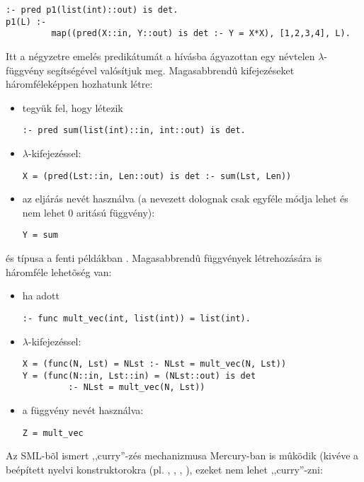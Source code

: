 \begin{verbatim} 
:- pred p1(list(int)::out) is det.
p1(L) :-
         map((pred(X::in, Y::out) is det :- Y = X*X), [1,2,3,4], L).
\end{verbatim}

Itt a négyzetre emelés predikátumát a  hívásba ágyazottan egy névtelen
$\lambda$-függvény segítségével valósítjuk meg.
\br
Magasabbrendû kifejezéseket háromféleképpen hozhatunk létre:

\begin{itemize}
\item tegyük fel, hogy létezik
\begin{verbatim}
:- pred sum(list(int)::in, int::out) is det.
\end{verbatim}
\item $\lambda$-kifejezéssel:
\begin{verbatim}
X = (pred(Lst::in, Len::out) is det :- sum(Lst, Len))
\end{verbatim}
\item az eljárás nevét használva (a nevezett dolognak csak egyféle módja lehet
és nem lehet 0 aritású függvény):
\begin{verbatim}
Y = sum
\end{verbatim}
\end{itemize}

 és  típusa a fenti példákban .
\br
Magasabbrendû függvények létrehozására is háromféle lehetõség van:

\begin{itemize}
\item ha adott
\begin{verbatim}
:- func mult_vec(int, list(int)) = list(int).
\end{verbatim}
\item $\lambda$-kifejezéssel:
\begin{verbatim}
X = (func(N, Lst) = NLst :- NLst = mult_vec(N, Lst))
Y = (func(N::in, Lst::in) = (NLst::out) is det
         :- NLst = mult_vec(N, Lst))
\end{verbatim}
\item a függvény nevét használva:
\begin{verbatim}
Z = mult_vec
\end{verbatim}
\end{itemize}


Az SML-bõl ismert ,,curry''-zés mechanizmusa Mercury-ban is mûködik (kivéve
a beépített nyelvi konstruktorokra (pl. \cd{=}, \cd{\bs=}, , ),
ezeket nem lehet ,,curry''-zni:

